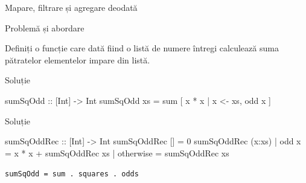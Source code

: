 \documentclass[xcolor=pdftex,romanian,colorlinks]{beamer}
\begin{document}
\begin{section}{Mapare, filtrare și agregare deodată}
\end{section}
\begin{frame}[fragile]{Problemă și abordare}
\begin{block}{}
Definiți o funcție care dată fiind o listă de numere întregi calculează suma pătratelor elementelor impare din listă.
\end{block}
\begin{block}{Soluție }
\begin{asciihs}
sumSqOdd :: [Int] -> Int
sumSqOdd xs = sum [ x * x | x <- xs, odd x ]
\end{asciihs}
\end{block}
\begin{block}{Soluție }
\begin{asciihs}
sumSqOddRec :: [Int] -> Int
sumSqOddRec []                 = 0
sumSqOddRec (x:xs) | odd x     = x * x + sumSqOddRec xs
                   | otherwise = sumSqOddRec xs
\end{asciihs}
\end{block}
\hfill \lstinline$sumSqOdd = sum . squares . odds$

\end{frame}
\end{document}
